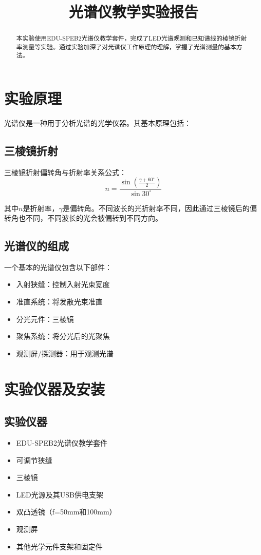 \documentclass{ctexart}
\title{光谱仪教学实验报告}
\begin{document}
\maketitle

\begin{abstract}
本实验使用EDU-SPEB2光谱仪教学套件，完成了LED光谱观测和已知谱线的棱镜折射率测量等实验。通过实验加深了对光谱仪工作原理的理解，掌握了光谱测量的基本方法。
\end{abstract}

\section{实验原理}

光谱仪是一种用于分析光谱的光学仪器。其基本原理包括：

\subsection{三棱镜折射}
三棱镜折射偏转角与折射率关系公式：
\[n=\frac{\sin\left(\frac{\gamma+60^\circ}{2}\right)}{\sin 30^\circ}\]

其中$n$是折射率，$\gamma$是偏转角。不同波长的光折射率不同，因此通过三棱镜后的偏转角也不同，不同波长的光会被偏转到不同方向。
\subsection{光谱仪的组成}
一个基本的光谱仪包含以下部件：
\begin{itemize}
    \item 入射狭缝：控制入射光束宽度
    \item 准直系统：将发散光束准直
    \item 分光元件：三棱镜
    \item 聚焦系统：将分光后的光聚焦
    \item 观测屏/探测器：用于观测光谱
\end{itemize}

\section{实验仪器及安装}
\subsection{实验仪器}
\begin{itemize}
    \item EDU-SPEB2光谱仪教学套件
    \item 可调节狭缝
    \item 三棱镜
    \item LED光源及其USB供电支架
    \item 双凸透镜（f=50mm和100mm）
    \item 观测屏
    \item 其他光学元件支架和固定件
\end{itemize}
\end{document}
